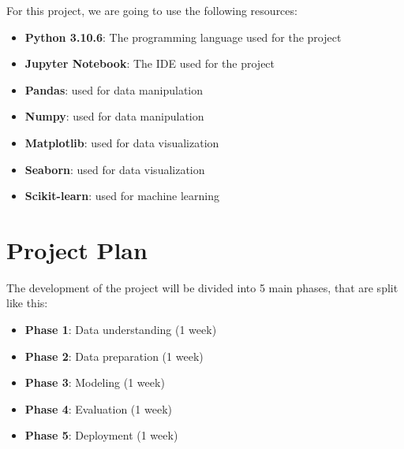 For this project, we are going to use the following resources:

\begin{itemize}
    \item \textbf{Python 3.10.6}: The programming language used for the project
    \item \textbf{Jupyter Notebook}: The IDE used for the project
    \item \textbf{Pandas}: used for data manipulation
    \item \textbf{Numpy}: used for data manipulation
    \item \textbf{Matplotlib}: used for data visualization
    \item \textbf{Seaborn}: used for data visualization
    \item \textbf{Scikit-learn}: used for machine learning 
\end{itemize}

\section{Project Plan}
\label{subsec:project_plan}

The development of the project will be divided into 5 main phases, that are split like this:

\begin{itemize}
    \item \textbf{Phase 1}: Data understanding (1 week)
    \item \textbf{Phase 2}: Data preparation (1 week)
    \item \textbf{Phase 3}: Modeling (1 week)
    \item \textbf{Phase 4}: Evaluation (1 week)
    \item \textbf{Phase 5}: Deployment (1 week)
\end{itemize}

\newpage